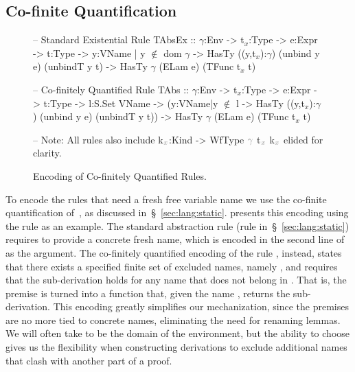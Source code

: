 \begin{fullversion}
  \subsection{Co-finite Quantification}
  \label{subsec:implementation:co-finite}
  \begin{figure}[t!]
  \begin{mcode}
-- Standard Existential Rule
TAbsEx  :: $\gamma$:Env -> t$_x$:Type -> e:Expr -> t:Type
        -> y:{VName | y $\not\in$ dom $\gamma$ }
        -> HasTy ((y,t$_x$):$\gamma$) (unbind y e) (unbindT y t)
        -> HasTy $\gamma$ (ELam e) (TFunc t$_x$ t)

-- Co-finitely Quantified Rule
TAbs    :: $\gamma$:Env -> t$_x$:Type -> e:Expr -> t:Type -> l:S.Set VName
        -> (y:{VName|y $\not\in$ l} -> HasTy ((y,t$_x$):$\gamma$) (unbind y e) (unbindT y t))
        -> HasTy $\gamma$ (ELam e) (TFunc t$_x$ t)

-- Note: All rules also include k$_{\color{gray_ulisses}x}$:Kind -> WfType ${\color{gray_ulisses}\gamma}$ t$_{\color{gray_ulisses}x}$ k$_{\color{gray_ulisses}x}$ elided for clarity.
  \end{mcode}
  \caption{Encoding of Co-finitely Quantified Rules.}
  \label{fig:impl:co-finite}
  \end{figure}


  To encode the rules that need a fresh free variable name
  we use the co-finite quantification of~\citet{AydemirCPPW08}, as discussed
  in~\S~\ref{sec:lang:static}.
   presents
  this encoding using the \tAbs rule
  as an example.
  The standard abstraction rule
  (rule \tAbsEx in~\S~\ref{sec:lang:static})
  requires to provide a concrete fresh name,
  which is encoded in the second line of
   as the  argument.
  The co-finitely quantified encoding of the rule , instead,
  states that there exists a specified finite set of excluded names, namely ,
  and requires that the sub-derivation holds for any name 
  that does not belong in .
  That is, the premise is turned into a function
  that, given the name , returns the sub-derivation.
  This encoding greatly simplifies our mechanization,
  since the premises are no more tied to concrete names,
  eliminating the need for renaming lemmas.
  We will often take  to be the domain
  of the environment, but the ability to choose 
  gives us the flexibility when constructing derivations
  to exclude additional names that clash
  with another part of a proof.
\end{fullversion}
